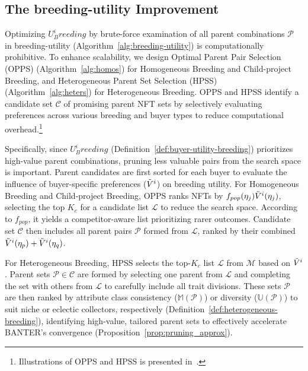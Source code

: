 \documentclass[conference]{IEEEtran}
\theoremstyle{plain}
\begin{document}
\subsection{The breeding-utility Improvement} 
\label{subsec:breeding-utility} 

    Optimizing $U^i_Breeding$ by brute-force examination of all parent combinations $\mathcal{P}$ in breeding-utility (Algorithm~\ref{alg:breeding-utility}) is computationally prohibitive. To enhance scalability, we design Optimal Parent Pair Selection (OPPS) (Algorithm~\ref{alg:homos}) for Homogeneous Breeding and Child-project Breeding, and Heterogeneous Parent Set Selection (HPSS) (Algorithm~\ref{alg:heters}) for Heterogeneous Breeding. OPPS and HPSS identify a candidate set $\mathcal{C}$ of promising parent NFT sets by selectively evaluating preferences across various breeding and buyer types to reduce computational overhead.\footnote{Illustrations of OPPS and HPSS is presented in~\cite{supplementary}.}

    Specifically, since $U^i_Breeding$ (Definition~\ref{def:buyer-utility-breeding}) prioritizes high-value parent combinations, pruning less valuable pairs from the search space is important. Parent candidates are first sorted for each buyer to evaluate the influence of buyer-specific preferences ($\Tilde{V}^i$) on breeding utility. For Homogeneous Breeding and Child-project Breeding, OPPS ranks NFTs by $f_{pop}(\eta_j)\Tilde{V}^i(\eta_j)$, selecting the top $K_c$ for a candidate list $\mathcal{L}$ to reduce the search space. According to $f_{pop}$, it yields a competitor-aware list prioritizing rarer outcomes. Candidate set $\mathcal{C}$ then includes all parent pairs $\mathcal{P}$ formed from $\mathcal{L}$, ranked by their combined $\Tilde{V}^i(\eta_p) + \Tilde{V}^i(\eta_q)$.

    For Heterogeneous Breeding, HPSS selects the top-$K_c$ list $\mathcal{L}$ from $\mathcal{M}$ based on $\Tilde{V}^i$. Parent sets $\mathcal{P} \in \mathcal{C}$ are formed by selecting one parent from $\mathcal{L}$ and completing the set with others from $\mathcal{L}$ to carefully include all trait divisions. These sets $\mathcal{P}$ are then ranked by attribute class consistency ($\mathbb{M}(\mathcal{P})$) or diversity ($\mathbb{U}(\mathcal{P})$) to suit niche or eclectic collectors, respectively (Definition~\ref{def:heterogeneous-breeding}), identifying high-value, tailored parent sets to effectively accelerate BANTER's convergence (Proposition~\ref{prop:pruning_approx}).
\end{document}
